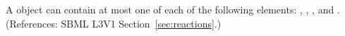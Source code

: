 A \Reaction object can contain at most one of each of the following
elements: , ,
, and .  (References: SBML L3V1
Section~\ref{sec:reactions}.)
